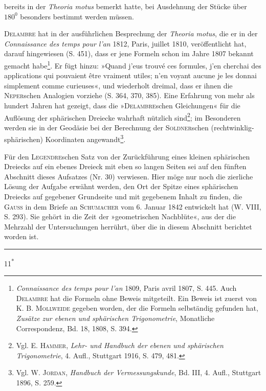 bereits in der \textit{Theoria motus} bemerkt hatte, bei Ausdehnung der Stücke über
\(180^0\) besonders bestimmt werden müssen.
\par
\textsc{Delambre} hat in der ausführlichen Besprechung der \textit{Theoria motus}, die
er in der \textit{Connaissance des temps pour l’an} 1812, Paris, juillet 1810, veröffentlicht
hat, darauf hingewiesen (S. 451), dass er jene Formeln schon im
Jahre 1807 bekannt gemacht habe\footnote{\textit{Connaissance des temps pour l’an} 1809, Paris avril 1807, S. 445. Auch \textsc{Delambre} hat die Formeln ohne Beweis mitgeteilt. Ein Beweis ist zuerst von K. B. \textsc{Mollweide} gegeben worden, der die Formeln selbständig gefunden hat, \textit{Zusätze zur ebenen und sphärischen Trigonometrie}, Monatliche Correspondenz, Bd. 18, 1808, S. 394.}. Er fügt hinzu: »Quand j’eus trouvé ces
formules, j’en cherchai des applications qui pouvaient être vraiment utiles;
n’en voyant aucune je les donnai simplement comme curieuses«, und wiederholt
dreimal, dass er ihnen die \textsc{Neper}schen Analogien vorziehe (S. 364, 370,
385). Eine Erfahrung von mehr als hundert Jahren hat gezeigt, dass die
»\textsc{Delambre}schen Gleichungen« für die Auflösung der sphärischen Dreiecke
wahrhaft nützlich sind\footnote{Vgl. E. \textsc{Hammer}, \textit{Lehr- und Handbuch der ebenen und sphärischen Trigonometrie}, 4. Aufl., Stuttgart 1916, S. 479, 481.}; im Besonderen werden sie in der Geodäsie bei der
Berechnung der \textsc{Soldner}schen (rechtwinklig-sphärischen) Koordinaten angewandt\footnote{Vgl. W. \textsc{Jordan}, \textit{Handbuch der Vermessungskunde}, Bd. III, 4. Aufl., Stuttgart 1896, S. 259.}.
\par
Für den \textsc{Legendre}schen Satz von der Zurückführung eines kleinen sphärischen
Dreiecks auf ein ebenes Dreieck mit eben so langen Seiten sei auf
den fünften Abschnitt dieses Aufsatzes (Nr. 30) verwiesen. Hier möge nur
noch die zierliche Lösung der Aufgabe erwähnt werden, den Ort der Spitze
eines sphärischen Dreiecks auf gegebener Grundseite und mit gegebenem
Inhalt zu finden, die \textsc{Gauss} in dem Briefe an \textsc{Schumacher} vom 6. Januar 1842
entwickelt hat (W. VIII, S. 293). Sie gehört in die Zeit der »geometrischen
Nachblüte«, aus der die Mehrzahl der Untersuchungen herrührt, über die in
diesem Abschnitt berichtet worden ist.
\begin{center}\rule{0.24\textwidth}{0.3pt}\end{center}
\par\smallskip\noindent\hfill{\small 11\textsuperscript{*}}\par
\clearpage\endgroup

